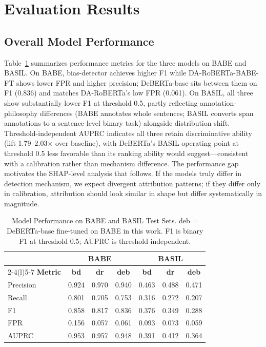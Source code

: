 \documentclass[11pt]{article}
\begin{document}
\section{Evaluation Results}
\subsection{Overall Model Performance}
Table~\ref{tab:performance} summarizes performance metrics for the 
three models on BABE and BASIL. On BABE, bias-detector achieves 
higher F1 while DA-RoBERTa-BABE-FT shows lower FPR and higher 
precision; DeBERTa-base sits between them on F1 (0.836) and matches 
DA-RoBERTa's low FPR (0.061). On BASIL, all three show substantially 
lower F1 at threshold 0.5, partly reflecting annotation-philosophy 
differences (BABE annotates whole sentences; BASIL converts span 
annotations to a sentence-level binary task) alongside distribution 
shift. Threshold-independent AUPRC indicates all three retain 
discriminative ability (lift 1.79--2.03$\times$ over baseline), with 
DeBERTa's BASIL operating point at threshold 0.5 less favorable than 
its ranking ability would suggest---consistent with a calibration 
rather than mechanism difference. The performance gap motivates the 
SHAP-level analysis that follows. If the models truly differ in 
detection mechanism, we expect divergent attribution patterns; if 
they differ only in calibration, attribution should look similar in 
shape but differ systematically in magnitude.

\begin{table}[htbp]
\centering
\small
\setlength{\tabcolsep}{3pt}
\begin{tabular}{lccc@{\hskip 6pt}ccc}
\toprule
& \multicolumn{3}{c}{BABE} & \multicolumn{3}{c}{BASIL} \\
\cmidrule(r){2-4}\cmidrule(l){5-7}
\textbf{Metric} & \textbf{bd} & \textbf{dr} & \textbf{deb} & \textbf{bd} & \textbf{dr} & \textbf{deb}\\
\midrule
Precision & 0.924 & 0.970 & 0.940 & 0.463 & 0.488 & 0.471 \\
Recall    & 0.801 & 0.705 & 0.753 & 0.316 & 0.272 & 0.207 \\
F1        & 0.858 & 0.817 & 0.836 & 0.376 & 0.349 & 0.288 \\
FPR       & 0.156 & 0.057 & 0.061 & 0.093 & 0.073 & 0.059 \\
AUPRC     & 0.953 & 0.957 & 0.948 & 0.391 & 0.412 & 0.364 \\
\bottomrule
\end{tabular}
\caption{Model Performance on BABE and BASIL Test Sets. deb = 
DeBERTa-base fine-tuned on BABE in this work. F1 is binary F1 at 
threshold 0.5; AUPRC is threshold-independent.}
\label{tab:performance}
\end{table}
\end{document}
